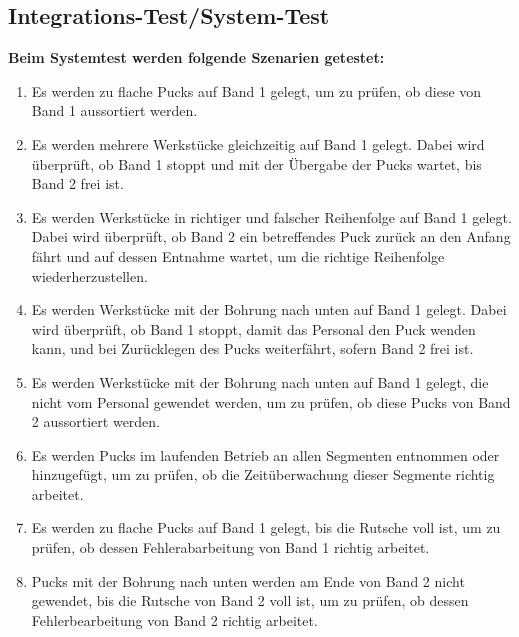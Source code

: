 \documentclass[oneside,a4paper,titlepage]{scrartcl} %
\begin{document}
\subsection{Integrations-Test/System-Test}
\textbf{Beim Systemtest werden folgende Szenarien getestet:}\\
\begin{enumerate}
  \item Es werden zu flache Pucks auf Band 1 gelegt, um zu prüfen, ob diese von Band 1 aussortiert werden.
  \item Es werden mehrere Werkstücke gleichzeitig auf Band 1 gelegt. Dabei wird überprüft, ob Band 1 stoppt und mit der Übergabe der Pucks wartet, bis Band 2 frei ist.
  \item Es werden Werkstücke in richtiger und falscher Reihenfolge auf Band 1 gelegt. Dabei wird überprüft, ob Band 2 ein betreffendes Puck zurück an den Anfang fährt und auf dessen Entnahme wartet, um die richtige Reihenfolge wiederherzustellen.
  \item Es werden Werkstücke mit der Bohrung nach unten auf Band 1 gelegt. Dabei wird überprüft, ob Band 1 stoppt, damit das Personal den Puck wenden kann, und bei Zurücklegen des Pucks weiterfährt, sofern Band 2 frei ist.
  \item Es werden Werkstücke mit der Bohrung nach unten auf Band 1 gelegt, die nicht vom Personal gewendet werden, um zu prüfen, ob diese Pucks von Band 2 aussortiert werden.
  \item Es werden Pucks im laufenden Betrieb an allen Segmenten entnommen oder hinzugefügt, um zu prüfen, ob die Zeitüberwachung dieser Segmente richtig arbeitet.
  \item Es werden zu flache Pucks auf Band 1 gelegt, bis die Rutsche voll ist, um zu prüfen, ob dessen Fehlerabarbeitung von Band 1 richtig arbeitet.
  \item Pucks mit der Bohrung nach unten werden am Ende von Band 2 nicht gewendet, bis die Rutsche von Band 2 voll ist, um zu prüfen, ob dessen Fehlerbearbeitung von Band 2 richtig arbeitet. 
\end{enumerate}

\newpage

\end{document}

